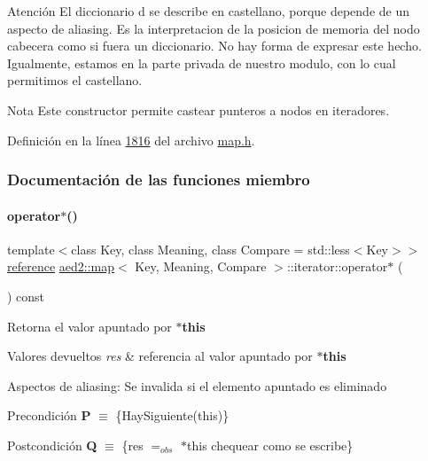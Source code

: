 \begin{DoxyAttention}{Atención}
El diccionario {\ttfamily d} se describe en castellano, porque depende de un aspecto de aliasing. Es la interpretacion de la posicion de memoria del nodo cabecera como si fuera un diccionario. No hay forma de expresar este hecho. Igualmente, estamos en la parte privada de nuestro modulo, con lo cual permitimos el castellano.
\end{DoxyAttention}
\begin{DoxyNote}{Nota}
Este constructor permite castear punteros a nodos en iteradores. 
\end{DoxyNote}


Definición en la línea \hyperlink{map_8h_source_l01816}{1816} del archivo \hyperlink{map_8h_source}{map.\+h}.



\subsubsection{Documentación de las funciones miembro}
\mbox{\label{classaed2_1_1map_1_1iterator_ab115711d0295146906830840590d900a_ab115711d0295146906830840590d900a}} 
\paragraph{\texorpdfstring{operator$\ast$()}{operator*()}}
{\footnotesize\ttfamily template$<$class Key, class Meaning, class Compare = std\+::less$<$\+Key$>$$>$ \\
\hyperlink{classaed2_1_1map_1_1iterator_ac19788914a3110897e44c53f1318f6af_ac19788914a3110897e44c53f1318f6af}{reference} \hyperlink{classaed2_1_1map}{aed2\+::map}$<$ Key, Meaning, Compare $>$\+::iterator\+::operator$\ast$ (\begin{DoxyParamCaption}{ }\end{DoxyParamCaption}) const\hspace{0.3cm}{\ttfamily [inline]}}



Retorna el valor apuntado por {\bfseries $\ast$this} 


\begin{DoxyRetVals}{Valores devueltos}
{\em res} & referencia al valor apuntado por {\bfseries $\ast$this}\\
\hline
\end{DoxyRetVals}
\begin{DoxyParagraph}{Aspectos de aliasing\+:}
Se invalida si el elemento apuntado es eliminado
\end{DoxyParagraph}
\begin{DoxyPrecond}{Precondición}
{\bfseries P} $\equiv$ \{Hay\+Siguiente(this)\} 
\end{DoxyPrecond}
\begin{DoxyPostcond}{Postcondición}
{\bfseries Q} $\equiv$ \{res $=_{obs}$ $\ast$this chequear como se escribe\}
\end{DoxyPostcond}

